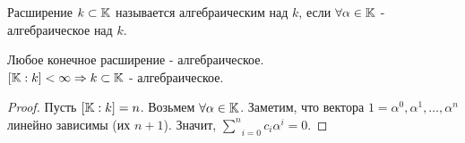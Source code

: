 \begin{defn}
Расширение $k \subset \mathbb{K}$ называется алгебраическим над $k$, если $\forall \alpha \in \mathbb{K}$ - алгебраическое над $k$.
\end{defn}

\begin{thm}
Любое конечное расширение - алгебраическое.\\
$[\mathbb{K}:k] < \infty \Rightarrow k \subset \mathbb{K}$ - алгебраическое.
\end{thm}
\begin{proof}
Пусть $[\mathbb{K}:k] = n$. Возьмем $\forall \alpha \in \mathbb{K}$.
Заметим, что вектора $1 = \alpha^0, \alpha^1, \dots, \alpha^n$ линейно зависимы (их $n + 1$). Значит,
$\underset{i = 0}{\overset{n}\sum}c_i\alpha^i = 0$.
\end{proof}



